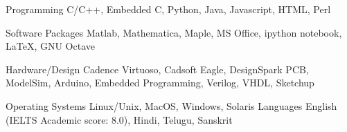 % 


\begin{cvskills}

  \cvskill
    {Programming} %
    {C/C++, Embedded C, Python, Java, Javascript, HTML, Perl} %

  \cvskill
    {Software Packages} %
    {Matlab, Mathematica, Maple, MS Office, ipython notebook, LaTeX, GNU Octave} %

  \cvskill
    {Hardware/Design} %
    {Cadence Virtuoso, Cadsoft Eagle, DesignSpark PCB, ModelSim, Arduino, Embedded Programming, Verilog, VHDL, Sketchup} %

\cvskill
{Operating Systems} %
{Linux/Unix, MacOS, Windows, Solaris} %
  \cvskill
    {Languages} %
    {English (IELTS Academic score: 8.0), Hindi, Telugu, Sanskrit} %

    
\end{cvskills}
% 
% 

